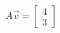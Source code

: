 \documentclass[preview]{standalone}
\begin{document}
\begin{align*}
A\vec{v} = \begin{bmatrix} 4 \\ 3 \end{bmatrix}
\end{align*}
\end{document}
